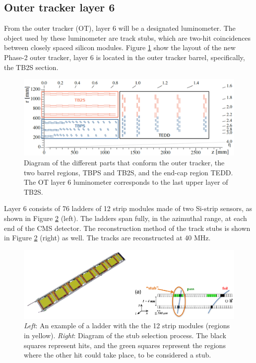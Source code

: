 \subsection*{Outer tracker layer 6}
From the outer tracker (OT), layer 6 will be a designated luminometer. The object used by these luminometer are track stubs, which are two-hit coincidences between closely spaced silicon modules. Figure \ref{ot} show the layout of the new Phase-2 outer tracker, layer 6 is located in the outer tracker barrel, specifically, the TB2S section.
\begin{center}
\begin{figure}[H]
    \centering
    \includegraphics[scale=.4]{Chapter3/ot.png}
    \caption[Outter tracker layout.]{Diagram of the different parts that conform the outer tracker, the two barrel regions, TBPS and TB2S, and the end-cap region TEDD. The OT layer 6 luminometer corresponds to the last upper layer of TB2S. }
    \label{ot}
\end{figure}
\end{center}

Layer 6 consists of 76 ladders of 12 strip modules made of two Si-strip sensors, as shown in Figure \ref{otlather} (left). The ladders span fully, in the azimuthal range, at each end of the CMS detector. The reconstruction method of the track stubs is shown in Figure \ref{otlather} (right) as well. The tracks are reconstructed at 40 MHz.
\begin{center}
\begin{figure}[H]
    \centering
    \includegraphics[scale=.7]{Chapter3/otlather.PNG}
    \caption[Example of an OT layer 6 ladder and the stub selection process.]{\textit{Left}: An example of a ladder with the the 12 strip modules (regions in yellow). \textit{Right}: Diagram of the stub selection process. The black squares represent hits, and the green squares represent the regions where the other hit could take place, to be considered a stub.}
    \label{otlather}
\end{figure}
\end{center}

